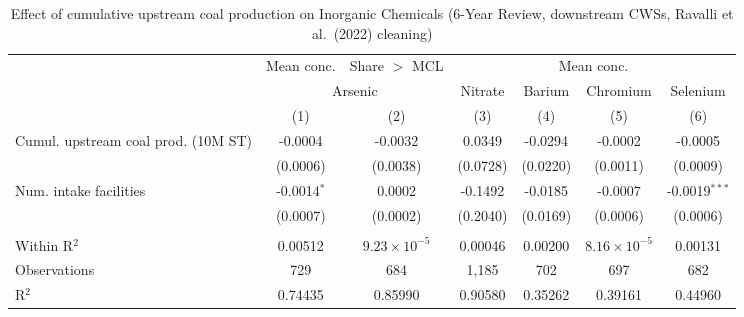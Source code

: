 
\begin{table}[htbp]
   
   \caption{\label{tab:6yr_huc02fe_inorg_ravalli} Effect of cumulative upstream coal production on Inorganic Chemicals (6-Year Review, downstream CWSs, Ravalli et al.~(2022) cleaning)}
   \bigskip
   
   \centering
   
   \begin{adjustbox}{width = \textwidth, center}
      
      
      \begin{tabular}{lcccccc}
         \toprule
         
          & Mean conc. & Share $>$ MCL & \multicolumn{4}{c}{Mean conc.}\\
         
          & \multicolumn{2}{c}{Arsenic} & Nitrate & Barium & Chromium & Selenium \\ 
         
                                             & (1)           & (2)                   & (3)           & (4)           & (5)                   & (6)\\  
         
         \midrule 
         Cumul. upstream coal prod. (10M ST) & -0.0004       & -0.0032               & 0.0349        & -0.0294       & -0.0002               & -0.0005\\   
                                             & (0.0006)      & (0.0038)              & (0.0728)      & (0.0220)      & (0.0011)              & (0.0009)\\   
         Num. intake facilities              & -0.0014$^{*}$ & 0.0002                & -0.1492       & -0.0185       & -0.0007               & -0.0019$^{***}$\\   
                                             & (0.0007)      & (0.0002)              & (0.2040)      & (0.0169)      & (0.0006)              & (0.0006)\\   
         
          \\
         
         Within R$^2$                        & 0.00512       & $9.23\times 10^{-5}$  & 0.00046       & 0.00200       & $8.16\times 10^{-5}$  & 0.00131\\  
         Observations                        & 729           & 684                   & 1,185         & 702           & 697                   & 682\\  
         R$^2$                               & 0.74435       & 0.85990               & 0.90580       & 0.35262       & 0.39161               & 0.44960\\  
         

\end{tabular}
\end{adjustbox}
\end{table}

